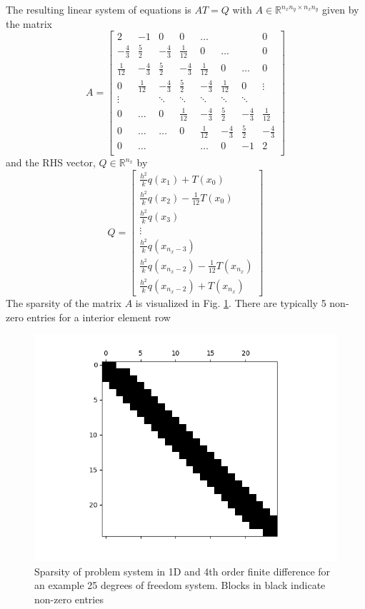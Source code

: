 \documentclass[letterpaper,12pt]{article}
\begin{document}
The resulting linear system of equations is $AT = Q$ with $A \in \mathbb{R}^{n_xn_y \times n_xn_y}$ given by the matrix
\[
A=
\begin{bmatrix}
2 & -1 & 0 & 0 & \dots & & & 0 \\
-\frac{4}{3} & \frac{5}{2} & -\frac{4}{3} & \frac{1}{12} & 0 & \dots & & 0\\
\frac{1}{12} & -\frac{4}{3} & \frac{5}{2} & -\frac{4}{3} & \frac{1}{12} & 0 & \dots & 0 \\
0 & \frac{1}{12} & -\frac{4}{3} & \frac{5}{2} & - \frac{4}{3} & \frac{1}{12} & 0 & \vdots \\
\vdots &  & \ddots & \ddots & \ddots & \ddots & \ddots & \\
0 & \dots & 0 & \frac{1}{12} & -\frac{4}{3} & \frac{5}{2} & -\frac{4}{3} & \frac{1}{12} \\
0 & \dots & \dots & 0 & \frac{1}{12} & -\frac{4}{3} & \frac{5}{2} & -\frac{4}{3} \\
0 & \dots & & & \dots & 0 & -1 & 2 \\
\end{bmatrix}
\]
and the RHS vector, $Q \in \mathbb{R}^{n_x}$ by
\[
Q= 
\begin{bmatrix}
\frac{h^2}{k} q(x_1) + T(x_0) \\
\frac{h^2}{k} q(x_2) - \frac{1}{12} T(x_0)\\
\frac{h^2}{k} q(x_3) \\
\vdots \\
\frac{h^2}{k} q(x_{n_x - 3}) \\
\frac{h^2}{k} q(x_{n_x-2}) - \frac{1}{12} T(x_{n_x}) \\
\frac{h^2}{k} q(x_{n_x-2}) + T(x_{n_x})
\end{bmatrix}
\]
The sparsity of the matrix $A$ is visualized in Fig. \ref{1D4thSparse}. There are typically 5 non-zero entries for a interior element row 

\begin{figure}[h]
\centering
\includegraphics[width=.9 \textwidth]{oned_sparse_4.png}
\caption{Sparsity of problem system in 1D and 4th order finite difference for an example 25 degrees of freedom system. Blocks in black indicate non-zero entries}
\label{1D4thSparse}
\end{figure}
\end{document}

